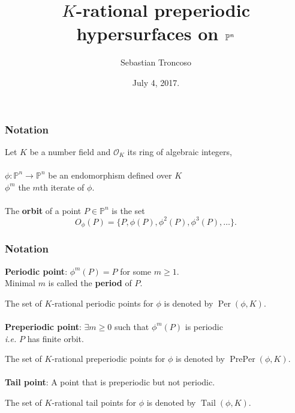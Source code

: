 \documentclass{beamer}
\title[Preperiodic Hypersurfaces]{$K$-rational preperiodic hypersurfaces on $\PP^n$}
\author[S. Troncoso]{Sebastian Troncoso}
\institute[MSU $\rightarrow$ BSC]{Michigan State University\\ $\downarrow$ \\ Birmingham-Southern College}
\date[July 4, 2017.]{ July 4, 2017. \\ \vspace{1cm} }
\def\PP{{\mathbb P}}
\DeclareMathOperator{\Tail}{Tail}
\DeclareMathOperator{\Per}{Per}
\DeclareMathOperator{\PrePer}{PrePer}
\theoremstyle{thmstyle}
\theoremstyle{thmstyle}
\theoremstyle{mystyle}
\theoremstyle{qstnstyle}
\begin{document}
\begin{frame}
\titlepage
\end{frame}

\begin{frame}
\frametitle{Notation}
Let $K$ be a number field  and $\mathcal{O}_K$ its ring of algebraic integers,
\\\quad\\
 
$\phi:\mathbb{P}^n\to\mathbb{P}^n$ be an endomorphism defined over $K$ \\ $\phi^m$ the $m$th iterate
of $\phi$.
\\\quad\\
 
The \textbf{orbit} of a point $P\in\PP^n$ is the set 
$$ O_{\phi}(P) = \{P, \phi(P),\phi^2(P),\phi^3(P),\ldots \}.$$

\end{frame}


\begin{frame}
\frametitle{Notation}

\textbf{Periodic point}: $\phi^m(P)=P$ for some $m\geq{1}$.
\\\quad\quad   Minimal $m$ is called the \textbf{period} of $P$.

 
\vspace{2mm}
The set of $K$-rational periodic points for $\phi$ is denoted by $\Per(\phi,K)$.
\\\quad\\
 
\textbf{Preperiodic point}: $\exists m\geq{0}$ such that $\phi^m(P)$
is periodic \\\quad\quad   \emph{i.e.}  $P$ has finite orbit.

 
\vspace{2mm}
The set of $K$-rational preperiodic points for $\phi$ is denoted by $\PrePer(\phi,K)$.
\\\quad\\
 
\textbf{Tail point}: A point that is preperiodic but not periodic.

 
\vspace{2mm}
The set of $K$-rational tail points for $\phi$ is denoted by $\Tail(\phi,K)$.
\end{frame}
\end{document}
